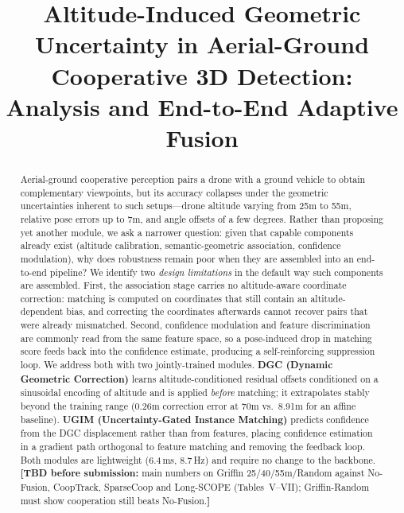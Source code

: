 \documentclass[9.5pt,twocolumn,a4paper]{IEEEtran}
\begin{document}
\title{Altitude-Induced Geometric Uncertainty in Aerial-Ground Cooperative 3D Detection:\\Analysis and End-to-End Adaptive Fusion}

\author{
}

\maketitle

\begin{abstract}
Aerial-ground cooperative perception pairs a drone with a ground vehicle to obtain complementary viewpoints, but its accuracy collapses under the geometric uncertainties inherent to such setups---drone altitude varying from 25m to 55m, relative pose errors up to 7m, and angle offsets of a few degrees. Rather than proposing yet another module, we ask a narrower question: given that capable components already exist (altitude calibration, semantic-geometric association, confidence modulation), why does robustness remain poor when they are assembled into an end-to-end pipeline? We identify two \emph{design limitations} in the default way such components are assembled. First, the association stage carries no altitude-aware coordinate correction: matching is computed on coordinates that still contain an altitude-dependent bias, and correcting the coordinates afterwards cannot recover pairs that were already mismatched. Second, confidence modulation and feature discrimination are commonly read from the same feature space, so a pose-induced drop in matching score feeds back into the confidence estimate, producing a self-reinforcing suppression loop. We address both with two jointly-trained modules. \textbf{DGC (Dynamic Geometric Correction)} learns altitude-conditioned residual offsets conditioned on a sinusoidal encoding of altitude and is applied \emph{before} matching; it extrapolates stably beyond the training range (0.26m correction error at 70m vs.\ 8.91m for an affine baseline). \textbf{UGIM (Uncertainty-Gated Instance Matching)} predicts confidence from the DGC displacement rather than from features, placing confidence estimation in a gradient path orthogonal to feature matching and removing the feedback loop. Both modules are lightweight (6.4\,ms, 8.7\,Hz) and require no change to the backbone.
\noindent\textbf{[TBD before submission:} main numbers on Griffin 25/40/55m/Random against No-Fusion, CoopTrack, SparseCoop and Long-SCOPE (Tables~V--VII); Griffin-Random must show cooperation still beats No-Fusion.\textbf{]}
\end{abstract}
\end{document}
